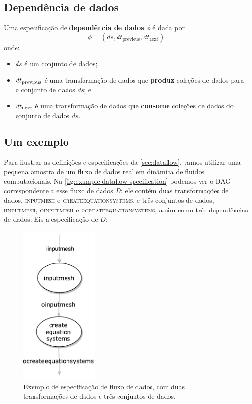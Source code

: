 \subsection{Dependência de dados}

Uma especificação de \textbf{dependência de dados} \( \phi \) é dada por \[ \phi = (ds, dt_{\textrm{previous}}, dt_{\textrm{next}}) \] onde:
\begin{itemize}
    \item \( ds \) é um conjunto de dados;
    \item \( dt_{\textup{previous}} \) é uma transformação de dados que {\bf produz} coleções de dados para o conjunto de dados \( ds \); e
    \item \( dt_{\textup{next}} \) é uma transformação de dados que {\bf consome} coleções de dados do conjunto de dados \( ds \).
\end{itemize}

\subsection{Um exemplo}%
\label{sec:um-exemplo-de-dataflow}

Para ilustrar as definições e especificações da \autoref{sec:dataflow}, vamos utilizar uma pequena amostra de um fluxo de dados real em dinâmica de fluidos computacionais. Na \autoref{fig:example-dataflow-specification} podemos ver o DAG correspondente a esse fluxo de dados \( D \): ele contém duas transformações de dados, \textsc{inputmesh} e \textsc{createequationsystems}, e três conjuntos de dados, \textsc{iinputmesh}, \textsc{oinputmesh} e \textsc{ocreateequationsystems}, assim como três dependências de dados. Eis a especificação de \( D \):

\begin{figure}[htb]
    \centering
    \includegraphics[width=0.35\textwidth]{img/example-dataflow-specification}
    \caption[Exemplo de especificação de fluxo de dados]{Exemplo de especificação de fluxo de dados, com duas transformações de dados e três conjuntos de dados.}%
    \label{fig:example-dataflow-specification}
\end{figure}

